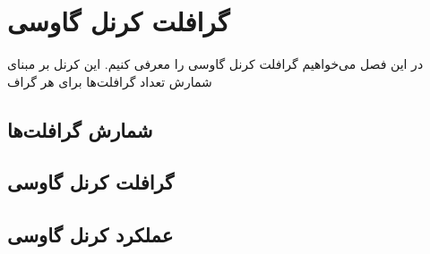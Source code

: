 \chapter{گرافلت کرنل گاوسی}
در این فصل می‌خواهیم گرافلت کرنل گاوسی را معرفی کنیم. این کرنل بر مبنای شمارش تعداد گرافلت‌ها برای هر گراف
\section{شمارش گرافلت‌ها}
\section{گرافلت کرنل گاوسی}
\section{عملکرد کرنل گاوسی}
